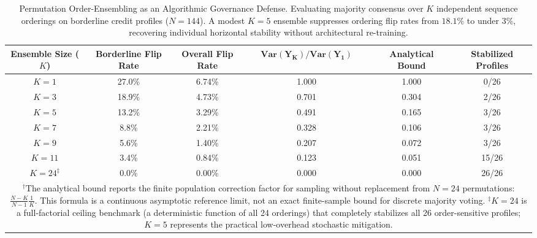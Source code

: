 \begin{table}[t]
\centering
\caption{Permutation Order-Ensembling as an Algorithmic Governance Defense. Evaluating majority consensus over $K$ independent sequence orderings on borderline credit profiles ($N=144$). A modest $K=5$ ensemble suppresses ordering flip rates from $18.1\%$ to under $3\%$, recovering individual horizontal stability without architectural re-training.}
\label{tab:order_ensemble_mitigation}
\vspace{2pt}
\scriptsize
\setlength{\tabcolsep}{4.5pt}
\begin{tabular}{@{}cccccc@{}}
\toprule
\textbf{Ensemble Size ($K$)} & \textbf{Borderline Flip Rate} & \textbf{Overall Flip Rate} & $\mathbf{\text{Var}(Y_K)/\text{Var}(Y_1)}$ & \textbf{Analytical Bound} & \textbf{Stabilized Profiles} \\
\midrule
$K = 1$ & 27.0\% & 6.74\% & 1.000 & 1.000 & 0/26 \\
$K = 3$ & 18.9\% & 4.73\% & 0.701 & 0.304 & 2/26 \\
$K = 5$ & 13.2\% & 3.29\% & 0.491 & 0.165 & 3/26 \\
$K = 7$ & 8.8\% & 2.21\% & 0.328 & 0.106 & 3/26 \\
$K = 9$ & 5.6\% & 1.40\% & 0.207 & 0.072 & 3/26 \\
$K = 11$ & 3.4\% & 0.84\% & 0.123 & 0.051 & 15/26 \\
$K = 24^\ddagger$ & 0.0\% & 0.00\% & 0.000 & 0.000 & 26/26 \\
\bottomrule
\multicolumn{6}{p{0.96\linewidth}}{\vspace{2pt}\tiny $^\dagger$The analytical bound reports the finite population correction factor for sampling without replacement from $N=24$ permutations: $\frac{N-K}{N-1}\frac{1}{K}$. This formula is a continuous asymptotic reference limit, not an exact finite-sample bound for discrete majority voting. $^\ddagger K=24$ is a full-factorial ceiling benchmark (a deterministic function of all 24 orderings) that completely stabilizes all 26 order-sensitive profiles; $K=5$ represents the practical low-overhead stochastic mitigation.}
\end{tabular}
\end{table}